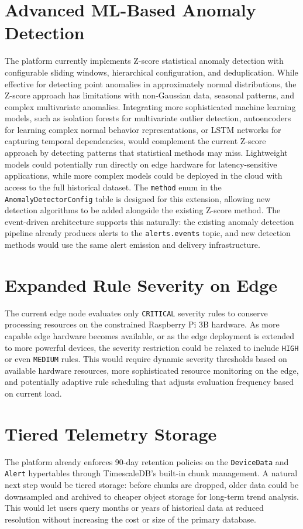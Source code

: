 \section{Advanced ML-Based Anomaly Detection}
The platform currently implements Z-score statistical anomaly detection with configurable sliding windows, hierarchical configuration, and deduplication. While effective for detecting point anomalies in approximately normal distributions, the Z-score approach has limitations with non-Gaussian data, seasonal patterns, and complex multivariate anomalies. Integrating more sophisticated machine learning models, such as isolation forests for multivariate outlier detection, autoencoders for learning complex normal behavior representations, or \gls{LSTM} networks for capturing temporal dependencies, would complement the current Z-score approach by detecting patterns that statistical methods may miss. Lightweight models could potentially run directly on edge hardware for latency-sensitive applications, while more complex models could be deployed in the cloud with access to the full historical dataset. The \texttt{method} enum in the \texttt{AnomalyDetectorConfig} table is designed for this extension, allowing new detection algorithms to be added alongside the existing Z-score method. The event-driven architecture supports this naturally: the existing anomaly detection pipeline already produces alerts to the \texttt{alerts.events} topic, and new detection methods would use the same alert emission and delivery infrastructure.

\section{Expanded Rule Severity on Edge}
The current edge node evaluates only \texttt{CRITICAL} severity rules to conserve processing resources on the constrained Raspberry Pi 3B hardware. As more capable edge hardware becomes available, or as the edge deployment is extended to more powerful devices, the severity restriction could be relaxed to include \texttt{HIGH} or even \texttt{MEDIUM} rules. This would require dynamic severity thresholds based on available hardware resources, more sophisticated resource monitoring on the edge, and potentially adaptive rule scheduling that adjusts evaluation frequency based on current load.

\section{Tiered Telemetry Storage}
The platform already enforces 90-day retention policies on the \texttt{DeviceData} and \texttt{Alert} hypertables through TimescaleDB's built-in chunk management. A natural next step would be tiered storage: before chunks are dropped, older data could be downsampled and archived to cheaper object storage for long-term trend analysis. This would let users query months or years of historical data at reduced resolution without increasing the cost or size of the primary database.

